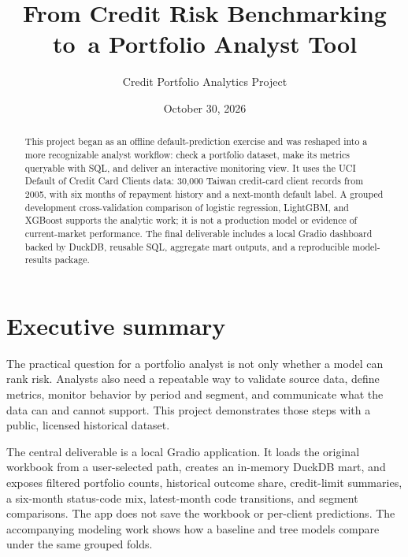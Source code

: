 \documentclass[11pt,letterpaper]{article}
\title{From Credit Risk Benchmarking to\ a Portfolio Analyst Tool}
\author{Credit Portfolio Analytics Project}
\date{October 30, 2026}
\begin{document}
\maketitle
\begin{abstract}
This project began as an offline default-prediction exercise and was reshaped into a more recognizable analyst workflow: check a portfolio dataset, make its metrics queryable with SQL, and deliver an interactive monitoring view. It uses the UCI Default of Credit Card Clients data: 30,000 Taiwan credit-card client records from 2005, with six months of repayment history and a next-month default label. A grouped development cross-validation comparison of logistic regression, LightGBM, and XGBoost supports the analytic work; it is not a production model or evidence of current-market performance. The final deliverable includes a local Gradio dashboard backed by DuckDB, reusable SQL, aggregate mart outputs, and a reproducible model-results package.
\end{abstract}
\tableofcontents

\newpage

\section{Executive summary}
The practical question for a portfolio analyst is not only whether a model can rank risk. Analysts also need a repeatable way to validate source data, define metrics, monitor behavior by period and segment, and communicate what the data can and cannot support. This project demonstrates those steps with a public, licensed historical dataset.

The central deliverable is a local Gradio application. It loads the original workbook from a user-selected path, creates an in-memory DuckDB mart, and exposes filtered portfolio counts, historical outcome share, credit-limit summaries, a six-month status-code mix, latest-month code transitions, and segment comparisons. The app does not save the workbook or per-client predictions. The accompanying modeling work shows how a baseline and tree models compare under the same grouped folds.
\end{document}
